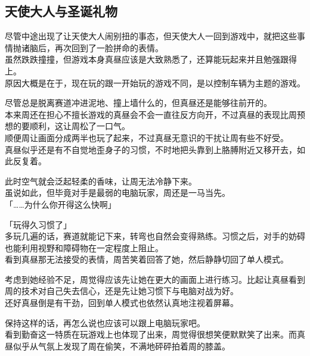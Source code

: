 \subsection{天使大人与圣诞礼物}

尽管中途出现了让天使大人闹别扭的事态，但天使大人一回到游戏中，就把这些事情抛诸脑后，再次回到了一脸拼命的表情。\\

虽然跌跌撞撞，但游戏本身真昼应该是大致熟悉了，还算能玩起来并且勉强跟得上。\\

原因大概是在于，现在玩的跟一开始玩的游戏不同，是以控制车辆为主题的游戏。

尽管总是脱离赛道冲进泥地、撞上墙什么的，但真昼还是能够往前开的。\\

本来周还在担心不擅长游戏的真昼会不会一直往反方向开，不过真昼的表现比周预想的要顺利，这让周松了一口气。\\

顺便周让画面分成两半也玩了起来，不过真昼无意识的干扰让周有些不好受。\\

真昼似乎还是有不自觉地歪身子的习惯，不时地把头靠到上胳膊附近又移开去，如此反复着。

此时空气就会泛起轻柔的香味，让周无法冷静下来。\\

虽说如此，但毕竟对手是最弱的电脑玩家，周还是一马当先。\\

「……为什么你开得这么快啊」

「玩得久习惯了」\\

多玩几遍的话，赛道就能记下来，转弯也自然会变得熟练。习惯之后，对手的妨碍也能利用视野和障碍物在一定程度上阻止。\\

看到真昼那无法接受的表情，周苦笑着回答了她，然后静静切回了单人模式。

考虑到她经验不足，周觉得应该先让她在更大的画面上进行练习。比起让真昼看到周的技术对自己失去信心，还是先让她习惯下与电脑对战为好。\\

还好真昼倒是有干劲，回到单人模式也依然认真地注视着屏幕。

保持这样的话，再怎么说也应该可以跟上电脑玩家吧。\\

看到勤奋这一特质在玩游戏上也体现了出来，周觉得很想笑便默默笑了出来。而真昼似乎从气氛上发现了周在偷笑，不满地砰砰拍着周的膝盖。

